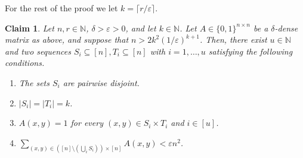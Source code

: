 \documentclass[11pt]{article}
\numberwithin{equation}{section}
\newtheorem{claim}[theorem]{Claim}
\theoremstyle{definition}
\theoremstyle{plain}
\newcommand{\N}{\mathbb N}
\theoremstyle{plain}
\newcommand{\colored}{}
\newcommand{\blocklength}{\colored{n}} %
\newcommand{\degree}{\colored{r}}
\newcommand{\prox}{\colored{\delta}}
\newcommand{\numrect}{\colored{u}}
\newcommand{\ceil}[1]{{\lceil#1\rceil}}
\newcommand{\eps}{\varepsilon}
\newcommand\abs[1]{\colored{\left|#1\right|}}
\newcommand{\Naturals}{\mathbb{N}}
\begin{document}
    For the rest of the proof we let $k = \ceil{\degree/\eps}$.

    \begin{claim}\label{claim:find all ones squares}
    Let $\blocklength,\degree \in \N$, $\prox > \eps >0$, and let $k \in \N$.
        Let $A \in \{0,1\}^{\blocklength \times \blocklength}$ be a $\prox$-dense matrix as above,
        and suppose that $\blocklength > 2k^2\left({1}/{\eps}\right)^{k+1}$.
        Then, there exist $\numrect \in \Naturals$ and two sequences $S_i \subseteq [\blocklength] ,T_i \subseteq [\blocklength]$ with $i=1, \dots, \numrect$
        satisfying the following conditions.
        \begin{enumerate}
%
%
            \item The sets $S_i$ are pairwise disjoint.                 %
            \item $\abs{S_i}=\abs{T_i} = k$.
            \item $A(x,y)=1$ for every $(x,y) \in S_i \times T_i$ and $i \in [\numrect]$.
%
            \item $\sum_{(x,y) \in  ([\blocklength] \setminus (\bigcup_i S_i)) \times [\blocklength]} A(x,y) < \eps \blocklength^2$. \label{item:leftover eps}      %
%
%
%
%
        \end{enumerate}
    \end{claim}
\end{document}
